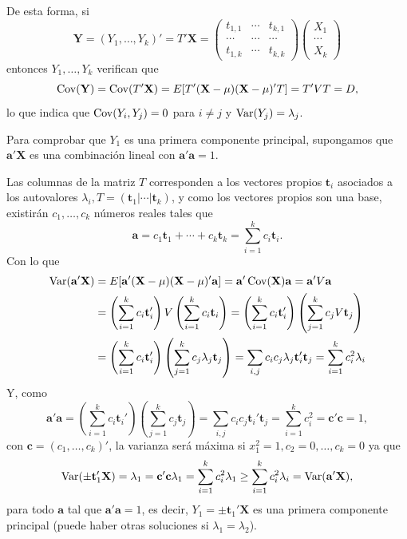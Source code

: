 De esta forma, si \[ \mathbf{Y}=(Y_1,\dots,Y_k)'=T'\mathbf{X}=\begin{pmatrix}
	t_{1,1} & \cdots & t_{k,1} \\
	\cdots & \cdots & \cdots \\
	t_{1,k} & \cdots & t_{k,k}
\end{pmatrix}\begin{pmatrix}
	X_1\\
	\cdots\\
	X_k
\end{pmatrix} \] entonces $Y_1,\dots,Y_k$ verifican que \[ \operatorname{Cov}(\mathbf{Y})=\operatorname{Cov}(T'\mathbf{X})=E[T'(\mathbf{X-\mu})(\mathbf{X}-\mu)'T]=T'VT=D, \]lo que indica que $\operatorname{Cov}(Y_i,Y_j)=0$ para $i\neq j$ y $\operatorname{Var}(Y_j)=\lambda_j$.

Para comprobar que $Y_1$ es una primera componente principal, supongamos que $\mathbf{a'X}$ es una combinación lineal con $\mathbf{a'a}=1$.

Las columnas de la matriz $T$ corresponden a los vectores propios $\mathbf{t}_i$ asociados a los autovalores $\lambda_i,T=(\mathbf{t}_1|\cdots|\mathbf{t}_k)$, y como los vectores propios son una base, existirán $c_1,\dots,c_k$ números reales tales que \[ \mathbf{a}=c_1\mathbf{t}_1+\cdots+c_k\mathbf{t}_k=\sum_{i=1}^{k}c_i\mathbf{t}_i. \]
Con lo que 
\begin{align*}
	\operatorname{Var}(\mathbf{a'X})&=E[\mathbf{a'(X-\mu)(X-\mu)'a}]=\mathbf{a}'\operatorname{Cov}(\mathbf{X})\mathbf{a}=\mathbf{a'}V\mathbf{a}\\
	&=\left(\sum_{i=1}^{k}c_i\mathbf{t}_i'\right)V\left(\sum_{i=1}^{k}c_i\mathbf{t}_i\right)=\left(\sum_{i=1}^{k}c_i\mathbf{t}_i'\right)\left(\sum_{j=1}^{k}c_jV\mathbf{t}_j\right)\\
	&=\left(\sum_{i=1}^{k}c_i\mathbf{t}_i'\right)\left(\sum_{j=1}^{k}c_j\lambda_j\mathbf{t}_j\right)=\sum_{i,j}c_ic_j\lambda_j\mathbf{t}_i'\mathbf{t}_j=\sum_{i=1}^{k}c_i^2\lambda_i
\end{align*}
Y, como \[ \mathbf{a'a}=\left(\sum_{i=1}^{k}c_i\mathbf{t}_i'\right)\left(\sum_{j=1}^{k}c_j\mathbf{t}_j\right)=\sum_{i,j}c_ic_j\mathbf{t}_i'\mathbf{t}_j=\sum_{i=1}^{k}c_i^2=\mathbf{c'c}=1, \] con $\mathbf{c}=(c_1,\dots,c_k)'$, la varianza será máxima si $x_1^2=1,c_2=0,\dots,c_k=0$ ya que \[ \operatorname{Var}(\pm\mathbf{t}_1'\mathbf{X})=\lambda_1=\mathbf{c'c}\lambda_1=\sum_{i=1}^{k}c_i^2\lambda_1\ge\sum_{i=1}^{k}c_i^2\lambda_i=\operatorname{Var}(\mathbf{a'X}), \]para todo $\mathbf{a}$ tal que $\mathbf{a'a}=1$, es decir, $Y_1=\pm \mathbf{t}_1'\mathbf{X}$ es una primera componente principal (puede haber otras soluciones si $\lambda_1=\lambda_2$).

